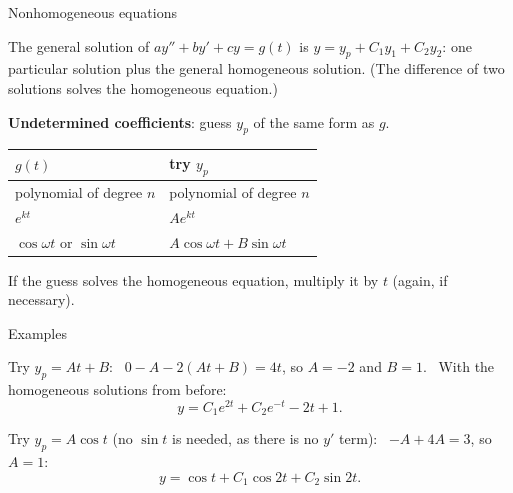 \documentclass[10pt]{wosm-slides}
\begin{document}
\begin{frame}{Nonhomogeneous equations}
  \begin{theorem}
    The general solution of $a y'' + b y' + c y = g(t)$ is $y = y_p + C_1 y_1 + C_2 y_2$: one particular
    solution plus the general homogeneous solution. (The difference of two solutions solves the
    homogeneous equation.)
  \end{theorem}
  \pause
  \textbf{Undetermined coefficients}: guess $y_p$ of the same form as $g$.
  \begin{center}
    \begin{tabular}{ll}
      \toprule
      $g(t)$ & try $y_p$ \\
      \midrule
      polynomial of degree $n$ & polynomial of degree $n$ \\
      $e^{kt}$ & $A e^{kt}$ \\
      $\cos\omega t$ or $\sin\omega t$ & $A\cos\omega t + B\sin\omega t$ \\
      \bottomrule
    \end{tabular}
  \end{center}
  If the guess solves the homogeneous equation, multiply it by $t$ (again, if necessary).
\end{frame}

\begin{frame}{Examples}
  \begin{example}[$y'' - y' - 2y = 4t$]
    Try $y_p = At + B$: \ $0 - A - 2(At + B) = 4t$, so $A = -2$ and $B = 1$. \ With the homogeneous
    solutions from before:
    \[ y = C_1 e^{2t} + C_2 e^{-t} - 2t + 1 . \]
  \end{example}
  \pause
  \begin{example}[$y'' + 4y = 3\cos t$]
    Try $y_p = A\cos t$ (no $\sin t$ is needed, as there is no $y'$ term): \ $-A + 4A = 3$, so $A = 1$:
    \[ y = \cos t + C_1 \cos 2t + C_2 \sin 2t . \]
  \end{example}
\end{frame}
\end{document}
